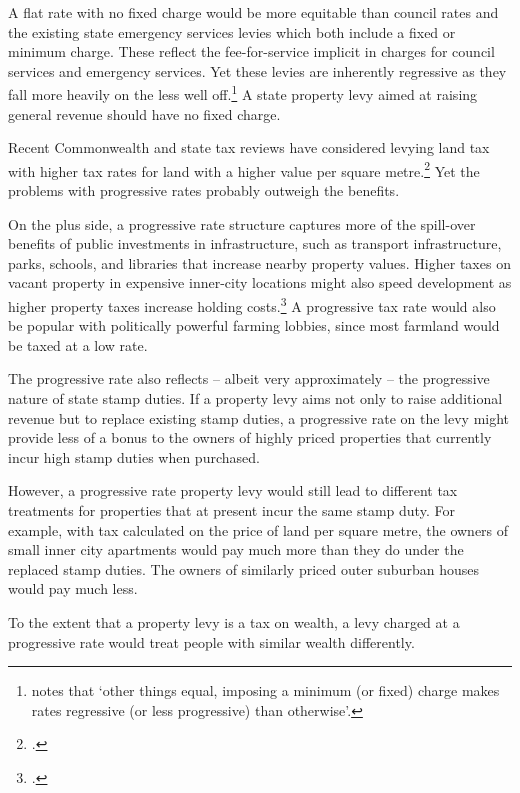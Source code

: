 \documentclass[twoside,english]{palatinob5ona4portrait}
\begin{document}
A flat rate with no fixed charge would be more equitable than council rates and the existing state emergency services levies which both include a fixed or minimum charge. These reflect the fee-for-service implicit in charges for council services and emergency services. Yet these levies are inherently regressive as they fall more heavily on the less well off.\footnote{\textcite[][139]{productivity2008assessing}  notes that ‘other things equal, imposing a minimum (or fixed) charge makes rates regressive (or less progressive) than otherwise’.}  A state property levy aimed at raising general revenue should have no fixed charge.

Recent Commonwealth and state tax reviews have considered levying land tax with higher tax rates for land with a higher value per square metre.\footcites[][265]{HenryTaxReview2010}[][41]{GovernmentSouthAustralia2015-State-Tax-Review-Discussion-Paper}  Yet the problems with progressive rates probably outweigh the benefits.

On the plus side, a progressive rate structure captures more of the spill-over benefits of public investments in infrastructure, such as transport infrastructure, parks, schools, and libraries that increase nearby property values. Higher taxes on vacant property in expensive inner-city locations might also speed development as higher property taxes increase holding costs.\footcite{WoodOngCigdemEtAl2012}  A progressive tax rate would also be popular with politically powerful farming lobbies, since most farmland would be taxed at a low rate.

The progressive rate also reflects – albeit very approximately – the progressive nature of state stamp duties. If a property levy aims not only to raise additional revenue but to replace existing stamp duties, a progressive rate on the levy might provide less of a bonus to the owners of highly priced properties that currently incur high stamp duties when purchased.

However, a progressive rate property levy would still lead to different tax treatments for properties that at present incur the same stamp duty. For example, with tax calculated on the price of land per square metre, the owners of small inner city apartments would pay much more than they do under the replaced stamp duties. The owners of similarly priced outer suburban houses would pay much less. 

To the extent that a property levy is a tax on wealth, a levy charged at a progressive rate would treat people with similar wealth differently. 
\end{document}
